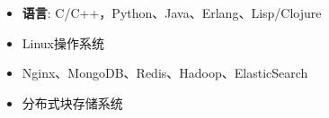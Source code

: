   \begin{itemize}[leftmargin=*]
    \item \textbf{语言}: C/C++，Python、Java、Erlang、Lisp/Clojure
    \item Linux操作系统
    \item Nginx、MongoDB、Redis、Hadoop、ElasticSearch
    \item 分布式块存储系统
  \end{itemize}
